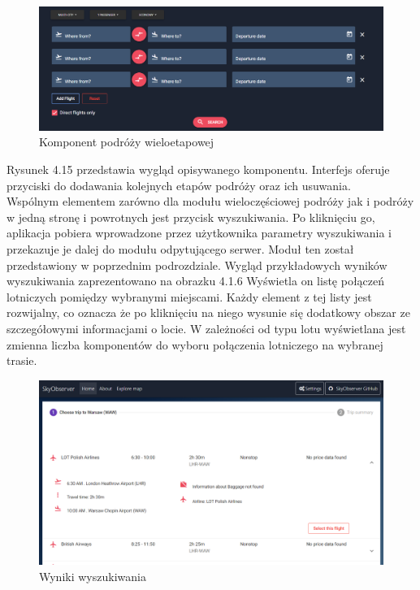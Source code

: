 \documentclass[12pt, twoside]{report}
\begin{document}
\begin{figure}[!ht]
\centering
\includegraphics[scale=0.40, keepaspectratio]{multi_panel.png}
\caption{Komponent podróży wieloetapowej}
\label{fig:multi_panel}
\end{figure}
\noindent Rysunek 4.15 przedstawia wygląd opisywanego komponentu. Interfejs oferuje przyciski do dodawania kolejnych etapów podróży oraz ich usuwania. \\ \indent
Wspólnym elementem zarówno dla modułu wieloczęściowej podróży jak i podróży w jedną stronę i powrotnych jest przycisk wyszukiwania. Po kliknięciu go, aplikacja pobiera wprowadzone przez użytkownika parametry wyszukiwania i przekazuje je dalej do modułu odpytującego serwer. Moduł ten został przedstawiony w poprzednim podrozdziale. Wygląd przykładowych wyników wyszukiwania zaprezentowano na obrazku 4.1.6 Wyświetla on listę połączeń lotniczych pomiędzy wybranymi miejscami. Każdy element z tej listy jest rozwijalny, co oznacza że po kliknięciu na niego wysunie się dodatkowy obszar ze szczegółowymi informacjami o locie. W zależności od typu lotu wyświetlana jest zmienna liczba komponentów do wyboru połączenia lotniczego na wybranej trasie.
\begin{figure}[!ht]
\centering
\includegraphics[scale=0.40, keepaspectratio]{result_component.png}
\caption{Wyniki wyszukiwania}
\label{fig:result_component}
\end{figure}
\end{document}
